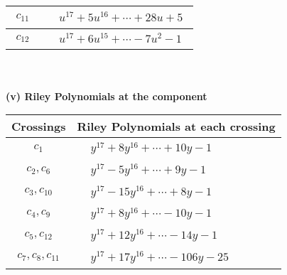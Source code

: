 \documentclass[1p]{elsarticle_modified}
\theoremstyle{definition}
\begin{document}
\begin{tabular}{m{50pt}|m{274pt}}
\hline $$\begin{aligned}c_{11}\end{aligned}$$&$\begin{aligned}
&u^{17}+5 u^{16}+\cdots+28 u+5
\end{aligned}$\\
\hline $$\begin{aligned}c_{12}\end{aligned}$$&$\begin{aligned}
&u^{17}+6 u^{15}+\cdots-7 u^2-1
\end{aligned}$\\
\hline
\end{tabular}\\~\\
\newpage\renewcommand{\arraystretch}{1}
\flushleft \textbf{(v) Riley Polynomials at the component}\newline \\
\begin{tabular}{m{50pt}|m{274pt}}
Crossings & \hspace{64pt}Riley Polynomials at each crossing \\
\hline $$\begin{aligned}c_{1}\end{aligned}$$&$\begin{aligned}
&y^{17}+8 y^{16}+\cdots+10 y-1
\end{aligned}$\\
\hline $$\begin{aligned}c_{2},c_{6}\end{aligned}$$&$\begin{aligned}
&y^{17}-5 y^{16}+\cdots+9 y-1
\end{aligned}$\\
\hline $$\begin{aligned}c_{3},c_{10}\end{aligned}$$&$\begin{aligned}
&y^{17}-15 y^{16}+\cdots+8 y-1
\end{aligned}$\\
\hline $$\begin{aligned}c_{4},c_{9}\end{aligned}$$&$\begin{aligned}
&y^{17}+8 y^{16}+\cdots-10 y-1
\end{aligned}$\\
\hline $$\begin{aligned}c_{5},c_{12}\end{aligned}$$&$\begin{aligned}
&y^{17}+12 y^{16}+\cdots-14 y-1
\end{aligned}$\\
\hline $$\begin{aligned}c_{7},c_{8},c_{11}\end{aligned}$$&$\begin{aligned}
&y^{17}+17 y^{16}+\cdots-106 y-25
\end{aligned}$\\
\hline
\end{tabular}\\~\\
\end{document}
